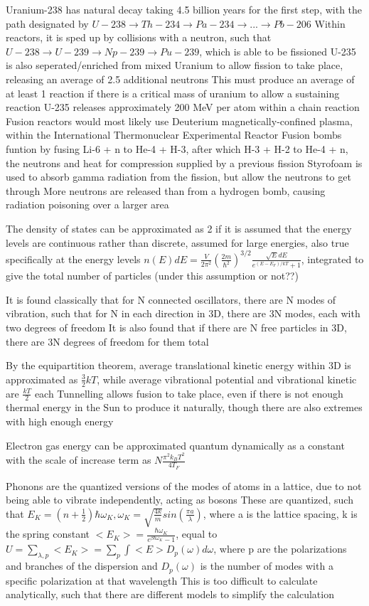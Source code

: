 \documentclass[11 pt, twoside]{article}
\newenvironment{outline*}
{
	\begin{outline}[enumerate]
	}
	{\end{outline}
}
\begin{document}
\begin{outline*}
\1 Uranium-238 has natural decay taking 4.5 billion years for the first step, with the path designated by $U-238 \to Th-234 \to Pa-234 \to ... \to Pb-206$
	\2 Within reactors, it is sped up by collisions with a neutron, such that $U-238 \to U-239 \to Np-239 \to Pu-239$, which is able to be fissioned
	\2 U-235 is also seperated/enriched from mixed Uranium to allow fission to take place, releasing an average of 2.5 additional neutrons
		\3 This must produce an average of at least 1 reaction if there is a critical mass of uranium to allow a sustaining reaction
	\2 U-235 releases approximately 200 MeV per atom within a chain reaction
	\2 Fusion reactors would most likely use Deuterium magnetically-confined plasma, within the International Thermonuclear Experimental Reactor
	\2 Fusion bombs funtion by fusing Li-6 + n to He-4 + H-3, after which H-3 + H-2 to He-4 + n, the neutrons and heat for compression supplied by a previous fission
		\3 Styrofoam is used to absorb gamma radiation from the fission, but allow the neutrons to get through
		\3 More neutrons are released than from a hydrogen bomb, causing radiation poisoning over a larger area

\1 The density of states can be approximated as 2 if it is assumed that the energy levels are continuous rather than discrete, assumed for large energies, also true specifically at the energy levels
	\2 $n(E)dE = \frac{V}{2\pi^2}(\frac{2m}{\hbar^2})^{3/2}\frac{\sqrt{E}dE}{e^{(E - E_F)/kT} + 1}$, integrated to give the total number of particles (under this assumption or not??)

\1 It is found classically that for N connected oscillators, there are N modes of vibration, such that for N in each direction in 3D, there are 3N modes, each with two degrees of freedom
	\2 It is also found that if there are N free particles in 3D, there are 3N degrees of freedom for them total

\1 By the equipartition theorem, average translational kinetic energy within 3D is approximated as $\frac{3}{2}kT$, while average vibrational potential and vibrational kinetic are $\frac{kT}{2}$ each
	\2 Tunnelling allows fusion to take place, even if there is not enough thermal energy in the Sun to produce it naturally, though there are also extremes with high enough energy

\1 Electron gas energy can be approximated quantum dynamically as a constant with the scale of increase term as $N\frac{\pi^2k_BT^2}{4T_F}$

\1 Phonons are the quantized versions of the modes of atoms in a lattice, due to not being able to vibrate independently, acting as bosons
	\2 These are quantized, such that $E_K = (n + \frac{1}{2})\hbar\omega_K, \omega_K = \sqrt{\frac{4k}{m}}sin(\frac{\pi a}{\lambda})$, where a is the lattice spacing, k is the spring constant
	\2 $<E_K> = \frac{\hbar\omega_K}{e^{\beta \hbar \omega_K} - 1}$, equal to $U = \sum_{\lambda, p} <E_K> = \sum_p \int <E> D_p(\omega)d\omega$, where p are the polarizations and branches of the dispersion and $D_p(\omega)$ is the number of modes with a specific polarization at that wavelength
	\2 This is too difficult to calculate analytically, such that there are different models to simplify the calculation


\end{outline*}
\end{document}
